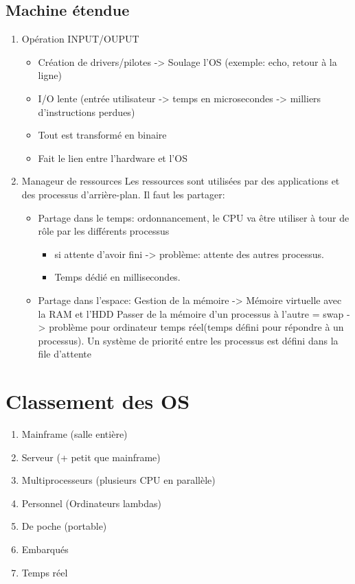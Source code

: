\subsection{Machine étendue}
\begin{enumerate}
\item Opération INPUT/OUPUT 
\begin{itemize}
  \item Création de drivers/pilotes -> Soulage l'OS (exemple: echo, retour à la ligne)
  \item I/O lente (entrée utilisateur -> temps en microsecondes -> milliers d'instructions perdues)
  \item Tout est transformé en binaire
  \item Fait le lien entre l'hardware et l'OS
\end{itemize}
\item Manageur de ressources
Les ressources sont utilisées par des applications et des processus d'arrière-plan.
Il faut les partager:
\begin{itemize}
  \item Partage dans le temps: ordonnancement, le CPU va être utiliser à tour de rôle par les différents processus 
  \begin{itemize}
    \item si attente d'avoir fini -> problème: attente des autres processus.
    \item Temps dédié en millisecondes.
  \end{itemize}
  \item Partage dans l'espace: Gestion de la mémoire -> Mémoire virtuelle avec la RAM et l'HDD
  Passer de la mémoire d'un processus à l'autre = swap -> problème pour ordinateur temps réel(temps défini pour répondre à un processus). 
  Un système de priorité entre les processus est défini dans la file d'attente
\end{itemize}
\end{enumerate}

\section{Classement des OS}
\begin{enumerate}
  \item Mainframe (salle entière)
  \item Serveur (+ petit que mainframe)
  \item Multiprocesseurs (plusieurs CPU en parallèle)
  \item Personnel (Ordinateurs lambdas)
  \item De poche (portable)
  \item Embarqués
  \item Temps réel
\end{enumerate}

